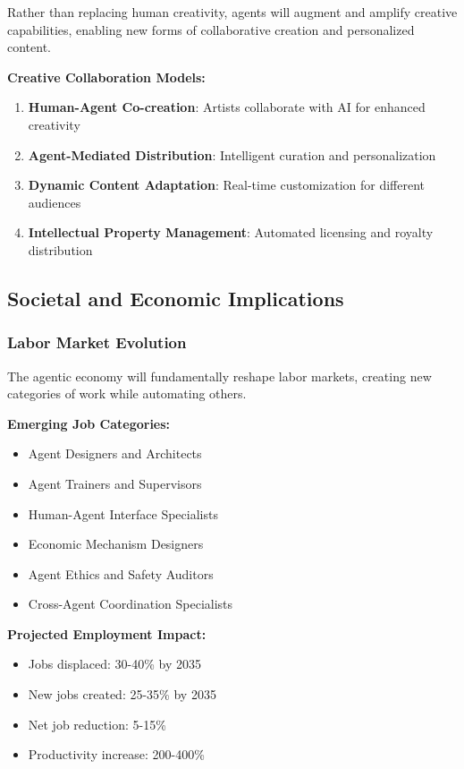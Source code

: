 \documentclass[12pt,a4paper]{article}
\begin{document}
Rather than replacing human creativity, agents will augment and amplify creative capabilities, enabling new forms of collaborative creation and personalized content.

\textbf{Creative Collaboration Models:}
\begin{enumerate}
\item \textbf{Human-Agent Co-creation}: Artists collaborate with AI for enhanced creativity
\item \textbf{Agent-Mediated Distribution}: Intelligent curation and personalization
\item \textbf{Dynamic Content Adaptation}: Real-time customization for different audiences
\item \textbf{Intellectual Property Management}: Automated licensing and royalty distribution
\end{enumerate}

\subsection{Societal and Economic Implications}

\subsubsection{Labor Market Evolution}

The agentic economy will fundamentally reshape labor markets, creating new categories of work while automating others.

\textbf{Emerging Job Categories:}
\begin{itemize}
\item Agent Designers and Architects
\item Agent Trainers and Supervisors
\item Human-Agent Interface Specialists
\item Economic Mechanism Designers
\item Agent Ethics and Safety Auditors
\item Cross-Agent Coordination Specialists
\end{itemize}

\textbf{Projected Employment Impact:}
\begin{itemize}
\item Jobs displaced: 30-40\% by 2035
\item New jobs created: 25-35\% by 2035
\item Net job reduction: 5-15\%
\item Productivity increase: 200-400\%
\end{itemize}
\end{document}
